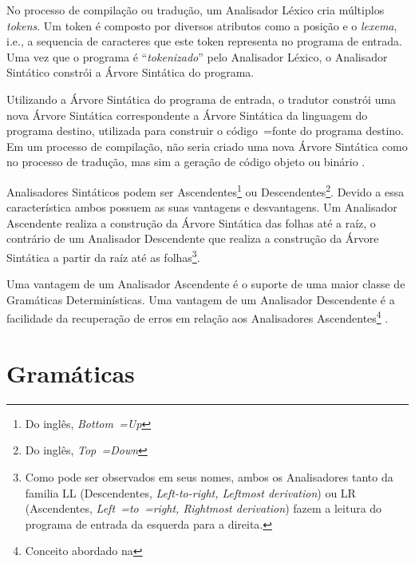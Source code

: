 {    No processo de compilação ou
    tradução,
    um Analisador Léxico cria múltiplos \textit{tokens}.
    Um token é composto por diversos atributos como a posição e
    o \textit{lexema}, i.e.,
    a sequencia de caracteres que este token representa no programa de entrada.
    Uma vez que o programa é ``\textit{tokenizado}'' pelo Analisador Léxico,
    o Analisador Sintático constrói a Árvore Sintática do programa.

    Utilizando a Árvore Sintática do programa de entrada,
    o tradutor constrói uma nova Árvore Sintática correspondente a Árvore Sintática da linguagem do programa destino,
    utilizada para construir o código~=fonte do programa destino.
    Em um processo de compilação,
    não seria criado uma nova Árvore Sintática como no processo de tradução,
    mas sim a geração de código objeto ou
    binário \cite{ahoCompilerDragonBook}.

    Analisadores Sintáticos podem ser Ascendentes\footnote{
    Do inglês, \textit{Bottom~=Up}
    }
    ou Descendentes\footnote{
    Do inglês, \textit{Top~=Down}
    }.
    Devido a essa característica ambos possuem as suas vantagens e
    desvantagens.
    Um Analisador Ascendente realiza a construção da Árvore Sintática das folhas até a raíz,
    o contrário de um Analisador Descendente que realiza a construção da Árvore Sintática a partir da raíz até as folhas\footnote{
    Como pode ser observados em seus nomes,
    ambos os Analisadores tanto da familia LL (Descendentes,
    \textit{Left-to-right, Leftmost derivation}) ou LR (Ascendentes, \textit{Left~=to~=right,
    Rightmost derivation}) fazem a leitura do programa de entrada da esquerda para a direita.
    }.

    Uma vantagem de um Analisador Ascendente é o suporte de uma maior classe de Gramáticas Determinísticas.
    Uma vantagem de um Analisador Descendente é a facilidade da recuperação de erros em relação aos Analisadores Ascendentes\footnote{
    Conceito abordado na
    }
    \cite{sippu1982,lr1ErrorRecovery,larkJosefGrosch}.


\section{Gramáticas}

}
